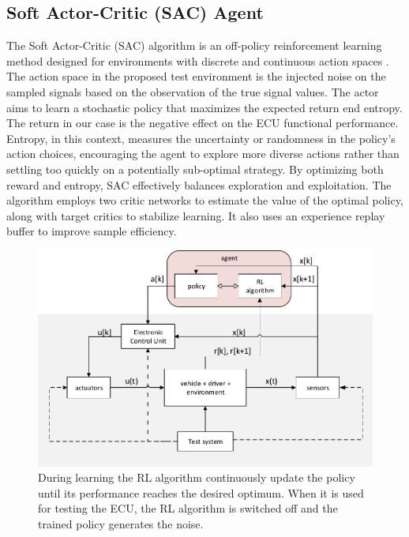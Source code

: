 \documentclass[a4paper, fleqn]{cas-dc}
\begin{document}
	\subsection{Soft Actor-Critic (SAC) Agent}
	The Soft Actor-Critic (SAC) algorithm is an off-policy reinforcement learning method designed for environments with discrete and continuous action spaces \cite{christodoulou2019soft, haarnoja2018soft}. The action space in the proposed test environment is the injected noise on the sampled signals based on the observation of the true signal values. The actor aims to learn a stochastic policy that maximizes the expected return end entropy. The return in our case is the negative effect on the ECU functional performance. Entropy, in this context, measures the uncertainty or randomness in the policy’s action choices, encouraging the agent to explore more diverse actions rather than settling too quickly on a potentially sub-optimal strategy. By optimizing both reward and entropy, SAC effectively balances exploration and exploitation. The algorithm employs two critic networks to estimate the value of the optimal policy, along with target critics to stabilize learning. It also uses an experience replay buffer to improve sample efficiency.
	
	\begin{figure}[h]
		\begin{center}
			\includegraphics[scale=0.5]{figures/system4.pdf}
			\caption{During learning the RL algorithm continuously update the policy until its performance reaches the desired optimum. When it is used for testing the ECU, the RL algorithm is switched off and the trained policy generates the noise.}
			\label{fig:RL}			
		\end{center}
	\end{figure}
	
\end{document}
